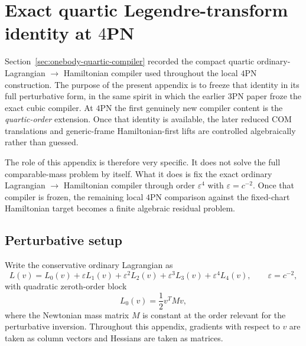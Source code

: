 \documentclass[11pt]{article}
\begin{document}

\section{Exact quartic Legendre-transform identity at \texorpdfstring{$4$}{4}PN}
\label{app:quartic-compiler}

Section~\ref{sec:onebody-quartic-compiler} recorded the compact quartic
ordinary-Lagrangian $\to$ Hamiltonian compiler used throughout the local $4$PN
construction.  The purpose of the present appendix is to freeze that identity in
its full perturbative form, in the same spirit in which the earlier $3$PN paper
froze the exact cubic compiler.  At $4$PN the first genuinely new compiler
content is the \emph{quartic-order} extension.  Once that identity is
available, the later reduced COM translations and generic-frame
Hamiltonian-first lifts are controlled algebraically rather than guessed.

The role of this appendix is therefore very specific.  It does not solve the
full comparable-mass problem by itself.  What it does is fix the exact ordinary
Lagrangian $\to$ Hamiltonian compiler through order $\varepsilon^4$ with
\(\varepsilon=c^{-2}\).  Once that compiler is frozen, the remaining local
$4$PN comparison against the fixed-chart Hamiltonian target becomes a finite
algebraic residual problem.

\subsection{Perturbative setup}
\label{app:quartic-legendre-setup}

Write the conservative ordinary Lagrangian as
\begin{equation}
L(v)=L_0(v)+\varepsilon L_1(v)+\varepsilon^2L_2(v)+\varepsilon^3L_3(v)+\varepsilon^4L_4(v),
\qquad
\varepsilon=c^{-2},
\label{eq:app-4pn-quartic-legendre-L-expansion}
\end{equation}
with quadratic zeroth-order block
\begin{equation}
L_0(v)=\frac12 v^T M v,
\label{eq:app-4pn-quartic-legendre-L0}
\end{equation}
where the Newtonian mass matrix \(M\) is constant at the order relevant for the
perturbative inversion.  Throughout this appendix, gradients with respect to
\(v\) are taken as column vectors and Hessians are taken as matrices.
\end{document}
